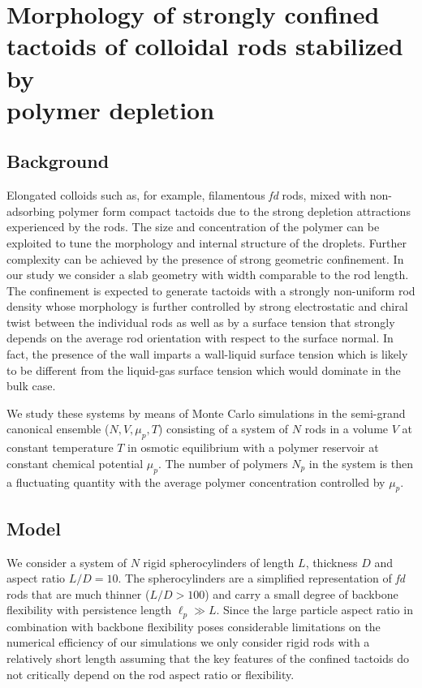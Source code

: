 
\chapter{Morphology of strongly confined tactoids of colloidal rods stabilized by \\
polymer depletion}

\section{Background}

Elongated colloids such as, for example,  filamentous {\em fd} rods, mixed with non-adsorbing polymer form compact tactoids due to the strong depletion attractions experienced by the rods. The size and concentration of the polymer can be exploited to  tune the morphology and internal structure of the droplets. Further complexity can be achieved by the presence of strong geometric confinement.  In our study we consider a slab geometry with width comparable to the rod length. The confinement is expected to generate tactoids with a strongly non-uniform rod density whose morphology is further controlled by strong electrostatic and chiral twist between the individual rods as well as by a surface tension that strongly depends on the average rod orientation with respect to the surface normal. In fact, the presence of the wall imparts a wall-liquid surface tension which is likely to be different from the liquid-gas surface tension which would dominate in the bulk case.

We study these systems by means of Monte Carlo simulations in the semi-grand canonical ensemble ($N,V,\mu_{p},T$) consisting of a system of $N$ rods in a volume $V$ at constant temperature $T$ in osmotic equilibrium with a polymer reservoir at constant chemical potential $\mu_{p}$. The number of polymers  $N_{p}$ in the system is then a fluctuating quantity with the average polymer concentration controlled by $\mu_{p}$.

\section{Model}

We consider a system of $N$ rigid spherocylinders of length $L$, thickness $D$ and aspect ratio $L/D= 10$. The spherocylinders are a simplified representation of {\em fd} rods that are much thinner ($L/D > 100$) and carry a small degree of backbone flexibility with persistence length $\ell_{p} \gg L$. Since the large particle aspect ratio in combination with backbone flexibility poses considerable limitations on the numerical efficiency of our simulations  we  only consider rigid rods with a relatively short length assuming that the key features of the confined tactoids do not  critically depend on the rod aspect ratio or flexibility.

